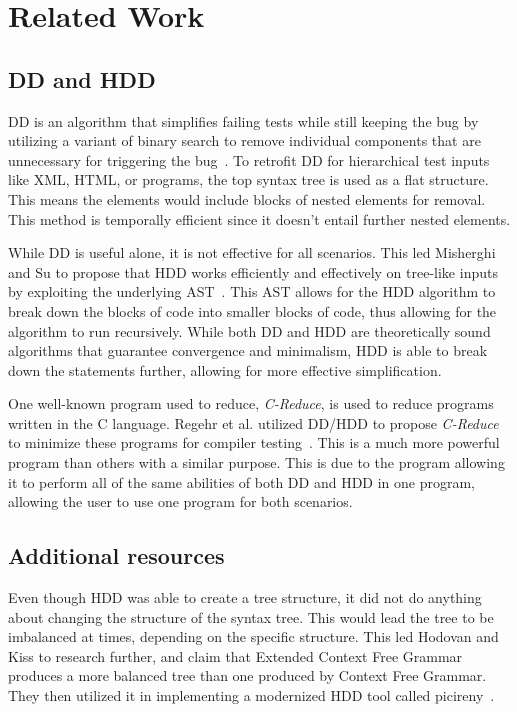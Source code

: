 \clearpage %

\chapter{Related Work}\label{CH2_RelatedWork}

\section{DD and HDD}
DD is an algorithm that simplifies failing tests while still keeping the bug by utilizing a variant of binary search to remove individual components that are unnecessary for triggering the bug~\cite{zeller2002simplifying}. To retrofit DD for hierarchical test inputs like XML, HTML, or programs, the top syntax tree is used as a flat structure. This means the elements would include blocks of nested elements for removal. This method is temporally efficient since it doesn't entail further nested elements.

While DD is useful alone, it is not effective for all scenarios. This led Misherghi and Su to propose that HDD works efficiently and effectively on tree-like inputs by exploiting the underlying AST~\cite{misherghi2006hdd}. This AST allows for the HDD algorithm to break down the blocks of code into smaller blocks of code, thus allowing for the algorithm to run recursively. While both DD and HDD are theoretically sound algorithms that guarantee convergence and minimalism, HDD is able to break down the statements further, allowing for more effective simplification. 

One well-known program used to reduce, \emph{C-Reduce}, is used to reduce programs written in the C language. Regehr et al. utilized DD/HDD to propose \emph{C-Reduce} to minimize these programs for compiler testing~\cite{regehr_eide_chen_2019}. This is a much more powerful program than others with a similar purpose. This is due to the program allowing it to perform all of the same abilities of both DD and HDD in one program, allowing the user to use one program for both scenarios. 

\section{Additional resources}
Even though HDD was able to create a tree structure, it did not do anything about changing the structure of the syntax tree. This would lead the tree to be imbalanced at times, depending on the specific structure. This led Hodovan and Kiss to research further, and claim that Extended Context Free Grammar produces a more balanced tree than one produced by Context Free Grammar. They then utilized it in implementing a modernized HDD tool called picireny~\cite{hodovan2016modernizing}.

